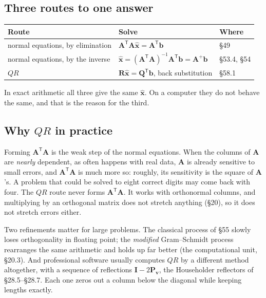 \documentclass[11pt]{article}
\theoremstyle{plain}
\theoremstyle{definition}
\theoremstyle{remark}
\newcommand{\vc}[1]{\mathbf{#1}}
\newcommand{\mt}[1]{\mathbf{#1}}
\newcommand{\T}{^{\mathsf{T}}}
\newcommand{\xh}{\hat{\vc{x}}}
\begin{document}
\subsection{Three routes to one answer}
\begin{center}
\renewcommand{\arraystretch}{1.4}
\begin{tabular}{@{}l l l@{}}
\toprule
\textbf{Route} & \textbf{Solve} & \textbf{Where} \\
\midrule
normal equations, by elimination & $\mt{A}\T\mt{A}\xh=\mt{A}\T\vc{b}$ & \S49 \\
normal equations, by the inverse & $\xh=(\mt{A}\T\mt{A})^{-1}\mt{A}\T\vc{b}=\mt{A}^{+}\vc{b}$ & \S53.4, \S54 \\
$QR$ & $\mt{R}\xh=\mt{Q}\T\vc{b}$, back substitution & \S58.1 \\
\bottomrule
\end{tabular}
\end{center}

\noindent In exact arithmetic all three give the same $\xh$. On a computer they do
not behave the same, and that is the reason for the third.

\subsection{Why \texorpdfstring{$QR$}{QR} in practice}
Forming $\mt{A}\T\mt{A}$ is the weak step of the normal equations. When the
columns of $\mt{A}$ are \emph{nearly} dependent, as often happens with real data,
$\mt{A}$ is already sensitive to small errors, and $\mt{A}\T\mt{A}$ is much more
so: roughly, its sensitivity is the square of $\mt{A}$'s. A problem that could be
solved to eight correct digits may come back with four. The $QR$ route never forms
$\mt{A}\T\mt{A}$. It works with orthonormal columns, and multiplying by an
orthogonal matrix does not stretch anything (\S20), so it does not stretch errors
either.

Two refinements matter for large problems. The classical process of \S55 slowly
loses orthogonality in floating point; the \emph{modified} Gram--Schmidt process
rearranges the same arithmetic and holds up far better (the computational unit,
\S20.3). And professional software usually computes $QR$ by a different method
altogether, with a sequence of reflections $\mt{I}-2\mt{P}_{\vc{v}}$, the
Householder reflectors of \S28.5--\S28.7. Each one zeros out a
column below the diagonal while keeping lengths exactly.
\end{document}
